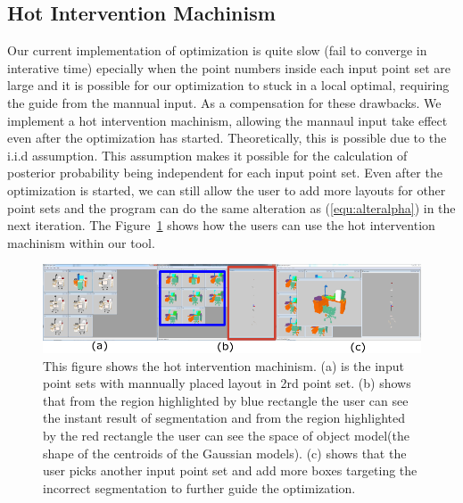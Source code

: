 \subsection{Hot Intervention Machinism}
Our current implementation of optimization is quite slow (fail to converge in interative time) epecially when the point numbers inside each input point set are large and it is possible for our optimization to stuck in a local optimal, requiring the guide from the mannual input. As a compensation for these drawbacks. We implement a hot intervention machinism, allowing the mannaul input take effect even after the optimization has started. Theoretically, this is possible due to the i.i.d assumption. 
This assumption makes it possible for the calculation of posterior probability being independent for each input point set. Even after the optimization is started, we can still allow the user to add more layouts for other point sets and the program can do the same alteration as (\ref{equ:alteralpha}) in the next iteration. The Figure~\ref{fig:hi} shows how the users can use the hot intervention machinism within our tool.
\begin{figure}[htb]
	\centering
	\includegraphics[width=\linewidth]{images/hotintervention/hi}
	\caption{\label{fig:hi}This figure shows the hot intervention machinism. (a) is the input point sets with mannually placed layout in 2rd point set. (b) shows that from the region highlighted by blue rectangle the user can see the instant result of segmentation and from the region highlighted by the red rectangle the user can see the space of object model(the shape of the centroids of the Gaussian models). (c) shows that the user picks another input point set and add more boxes targeting the incorrect segmentation to further guide the optimization.}
\end{figure}
 